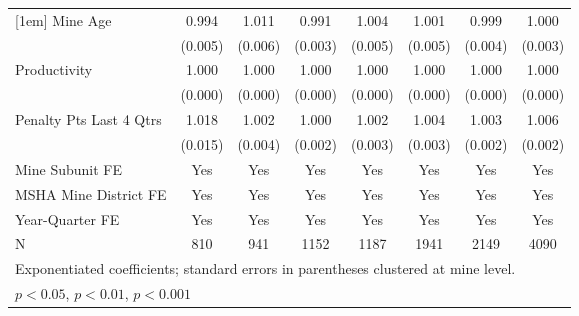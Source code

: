 {\begin{tabular}{l*{7}{c}}
[1em]
Mine Age                 &       0.994         &       1.011         &       0.991\sym{**} &       1.004         &       1.001         &       0.999         &       1.000         \\
                         &     (0.005)         &     (0.006)         &     (0.003)         &     (0.005)         &     (0.005)         &     (0.004)         &     (0.003)         \\
[1em]
Productivity             &       1.000         &       1.000         &       1.000\sym{**} &       1.000         &       1.000         &       1.000         &       1.000         \\
                         &     (0.000)         &     (0.000)         &     (0.000)         &     (0.000)         &     (0.000)         &     (0.000)         &     (0.000)         \\
[1em]
Penalty Pts Last 4 Qtrs  &       1.018         &       1.002         &       1.000         &       1.002         &       1.004         &       1.003         &       1.006\sym{*}  \\
                         &     (0.015)         &     (0.004)         &     (0.002)         &     (0.003)         &     (0.003)         &     (0.002)         &     (0.002)         \\
[1em]
Mine Subunit FE          &         Yes         &         Yes         &         Yes         &         Yes         &         Yes         &         Yes         &         Yes         \\
[1em]
MSHA Mine District FE    &         Yes         &         Yes         &         Yes         &         Yes         &         Yes         &         Yes         &         Yes         \\
[1em]
Year-Quarter FE          &         Yes         &         Yes         &         Yes         &         Yes         &         Yes         &         Yes         &         Yes         \\
\hline
N                        &         810         &         941         &        1152         &        1187         &        1941         &        2149         &        4090         \\
\hline\hline
\multicolumn{8}{l}{\footnotesize Exponentiated coefficients; standard errors in parentheses clustered at mine level.}\\
\multicolumn{8}{l}{\footnotesize \sym{*} \(p<0.05\), \sym{**} \(p<0.01\), \sym{***} \(p<0.001\)}\\
\end{tabular}
}
